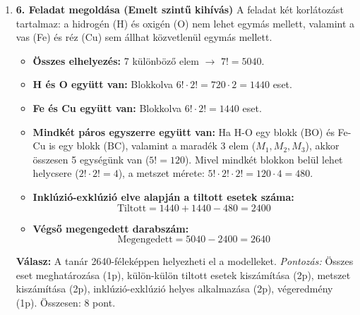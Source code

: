\documentclass[12pt,a4paper]{article}
\begin{document}
\begin{enumerate}[label=\arabic*., leftmargin=*]
    \item \textbf{6. Feladat megoldása (Emelt szintű kihívás)}
    A feladat két korlátozást tartalmaz: a hidrogén (H) és oxigén (O) nem lehet egymás mellett, valamint a vas (Fe) és réz (Cu) sem állhat közvetlenül egymás mellett.
    \begin{itemize}
        \item \textbf{Összes elhelyezés:} 7 különböző elem $\rightarrow$ $7! = 5040$.
        \item \textbf{H és O együtt van:} Blokkolva $6! \cdot 2! = 720 \cdot 2 = 1440$ eset.
        \item \textbf{Fe és Cu együtt van:} Blokkolva $6! \cdot 2! = 1440$ eset.
        \item \textbf{Mindkét páros egyszerre együtt van:} Ha H-O egy blokk ($\text{BO}$) és Fe-Cu is egy blokk ($\text{BC}$), valamint a maradék 3 elem ($M_1, M_2, M_3$), akkor összesen 5 egységünk van ($5! = 120$). Mivel mindkét blokkon belül lehet helycsere ($2! \cdot 2! = 4$), a metszet mérete: $5! \cdot 2! \cdot 2! = 120 \cdot 4 = 480$.
        \item \textbf{Inklúzió-exklúzió elve alapján a tiltott esetek száma:}
        \begin{equation*}
            \text{Tiltott} = 1440 + 1440 - 480 = 2400
        \end{equation*}
        \item \textbf{Végső megengedett darabszám:}
        \begin{equation*}
            \text{Megengedett} = 5040 - 2400 = 2640
        \end{equation*}
    \end{itemize}
    \textbf{Válasz:} A tanár 2640-féleképpen helyezheti el a modelleket.
    \textit{Pontozás:} Összes eset meghatározása (1p), külön-külön tiltott esetek kiszámítása (2p), metszet kiszámítása (2p), inklúzió-exklúzió helyes alkalmazása (2p), végeredmény (1p). Összesen: 8 pont.
\end{enumerate}
\end{document}
